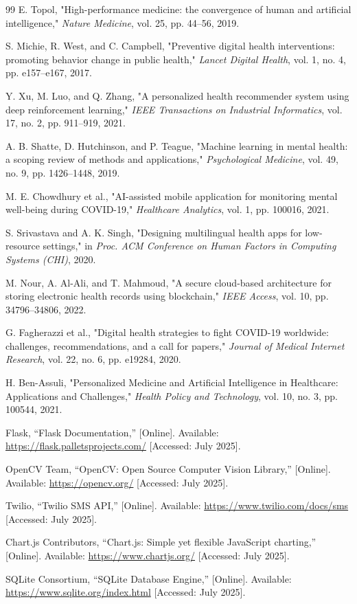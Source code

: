 \documentclass[conference]{IEEEtran}
\begin{document}
\begin{thebibliography}{99}
E. Topol, "High-performance medicine: the convergence of human and artificial intelligence," \textit{Nature Medicine}, vol. 25, pp. 44–56, 2019.

S. Michie, R. West, and C. Campbell, "Preventive digital health interventions: promoting behavior change in public health," \textit{Lancet Digital Health}, vol. 1, no. 4, pp. e157–e167, 2017.

Y. Xu, M. Luo, and Q. Zhang, "A personalized health recommender system using deep reinforcement learning," \textit{IEEE Transactions on Industrial Informatics}, vol. 17, no. 2, pp. 911–919, 2021.

A. B. Shatte, D. Hutchinson, and P. Teague, "Machine learning in mental health: a scoping review of methods and applications," \textit{Psychological Medicine}, vol. 49, no. 9, pp. 1426–1448, 2019.

M. E. Chowdhury et al., "AI-assisted mobile application for monitoring mental well-being during COVID-19," \textit{Healthcare Analytics}, vol. 1, pp. 100016, 2021.

S. Srivastava and A. K. Singh, "Designing multilingual health apps for low-resource settings," in \textit{Proc. ACM Conference on Human Factors in Computing Systems (CHI)}, 2020.

M. Nour, A. Al-Ali, and T. Mahmoud, "A secure cloud-based architecture for storing electronic health records using blockchain," \textit{IEEE Access}, vol. 10, pp. 34796–34806, 2022.

G. Fagherazzi et al., "Digital health strategies to fight COVID-19 worldwide: challenges, recommendations, and a call for papers," \textit{Journal of Medical Internet Research}, vol. 22, no. 6, pp. e19284, 2020.

H. Ben-Assuli, "Personalized Medicine and Artificial Intelligence in Healthcare: Applications and Challenges," \textit{Health Policy and Technology}, vol. 10, no. 3, pp. 100544, 2021.

Flask, “Flask Documentation,” [Online]. Available: \url{https://flask.palletsprojects.com/} [Accessed: July 2025].

OpenCV Team, “OpenCV: Open Source Computer Vision Library,” [Online]. Available: \url{https://opencv.org/} [Accessed: July 2025].

Twilio, “Twilio SMS API,” [Online]. Available: \url{https://www.twilio.com/docs/sms} [Accessed: July 2025].

Chart.js Contributors, “Chart.js: Simple yet flexible JavaScript charting,” [Online]. Available: \url{https://www.chartjs.org/} [Accessed: July 2025].

SQLite Consortium, “SQLite Database Engine,” [Online]. Available: \url{https://www.sqlite.org/index.html} [Accessed: July 2025].

\end{thebibliography}
\end{document}
